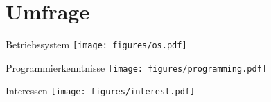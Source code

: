 \section{Umfrage}

\begin{frame}{Betriebssystem}
  \centering
  \texttt{[image: figures/os.pdf]}
\end{frame}

\begin{frame}{Programmierkenntnisse}
  \centering
  \texttt{[image: figures/programming.pdf]}
\end{frame}

\begin{frame}{Interessen}
  \centering
  \texttt{[image: figures/interest.pdf]}
\end{frame}
